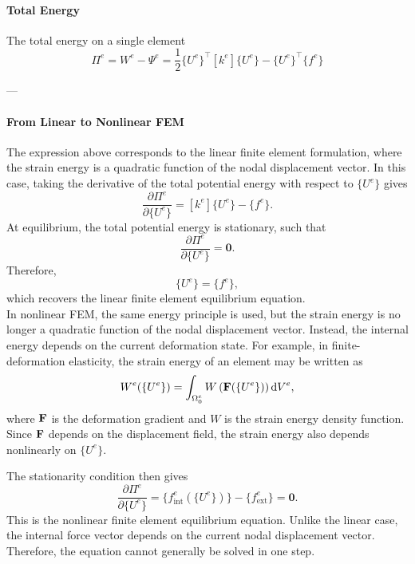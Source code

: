 \documentclass[12pt, a4paper]{article}
\numberwithin{equation}{section}
\begin{document}
\paragraph{Total Energy}
The total energy on a single element
\begin{equation}
    \Pi^e = W^e - \Psi^e = \frac{1}{2} \{U^e\}^\top [k^e] \{U^e\} - \{U^e\}^\top \{f^e\}
\end{equation}

---

\paragraph{From Linear to Nonlinear FEM}
The expression above corresponds to the linear finite element formulation, where the strain energy is a quadratic function of the nodal displacement vector. In this case, taking the derivative of the total potential energy with respect to $\{U^e\}$ gives
\begin{equation}
    \frac{\partial \Pi^e}{\partial \{U^e\}}
    =
    [k^e]\{U^e\} - \{f^e\}.
\end{equation}
At equilibrium, the total potential energy is stationary, such that
\begin{equation}
    \frac{\partial \Pi^e}{\partial \{U^e\}} = \mathbf{0}.
\end{equation}
Therefore,
\begin{equation}
    [k^e]\{U^e\} = \{f^e\},
\end{equation}
which recovers the linear finite element equilibrium equation.\\

In nonlinear FEM, the same energy principle is used, but the strain energy is no longer a quadratic function of the nodal displacement vector. Instead, the internal energy depends on the current deformation state. For example, in finite-deformation elasticity, the strain energy of an element may be written as
\begin{equation}
    W^e(\{U^e\})
    =
    \int_{\Omega_0^e}
    W\left(\mathbf{F}(\{U^e\})\right)
    \mathrm{d}V^e,
\end{equation}
where $\mathbf{F}$ is the deformation gradient and $W$ is the strain energy density function. Since $\mathbf{F}$ depends on the displacement field, the strain energy also depends nonlinearly on $\{U^e\}$.

The stationarity condition then gives
\begin{equation}
    \frac{\partial \Pi^e}{\partial \{U^e\}}
    =
    \{f_{\mathrm{int}}^e(\{U^e\})\}
    -
    \{f_{\mathrm{ext}}^e\}
    =
    \mathbf{0}.
\end{equation}
This is the nonlinear finite element equilibrium equation. Unlike the linear case, the internal force vector depends on the current nodal displacement vector. Therefore, the equation cannot generally be solved in one step.\\
\end{document}
